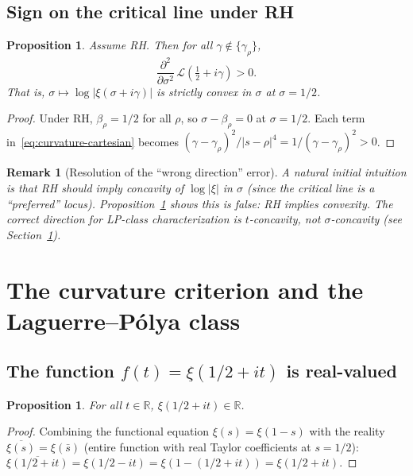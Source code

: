 \documentclass[11pt]{amsart}
\newtheorem{proposition}[theorem]{Proposition}
\newtheorem{remark}[theorem]{Remark}
\begin{document}
\subsection{Sign on the critical line under RH}

\begin{proposition}\label{prop:sigma-convex}
Assume RH. Then for all $\gamma \notin \{\gamma_\rho\}$,
\[
  \frac{\partial^2}{\partial\sigma^2}\,\mathcal{L}\!\left(\tfrac{1}{2}+i\gamma\right) > 0.
\]
That is, $\sigma \mapsto \log|\xi(\sigma+i\gamma)|$ is \emph{strictly convex} in $\sigma$
at $\sigma = 1/2$.
\end{proposition}

\begin{proof}
Under RH, $\beta_\rho = 1/2$ for all $\rho$, so $\sigma - \beta_\rho = 0$
at $\sigma = 1/2$.  Each term in~\eqref{eq:curvature-cartesian} becomes
$(\gamma-\gamma_\rho)^2/|s-\rho|^4 = 1/(\gamma-\gamma_\rho)^2 > 0$.
\end{proof}

\begin{remark}[Resolution of the ``wrong direction'' error]
A natural initial intuition is that RH should imply \emph{concavity} of
$\log|\xi|$ in $\sigma$ (since the critical line is a ``preferred'' locus).
Proposition~\ref{prop:sigma-convex} shows this is \emph{false}: RH implies
\emph{convexity}. The correct direction for LP-class characterization is
$t$-concavity, not $\sigma$-concavity (see Section~\ref{sec:lp}).
\end{remark}

\section{The curvature criterion and the Laguerre--P\'olya class}
\label{sec:lp}

\subsection{The function $f(t) = \xi(1/2+it)$ is real-valued}

\begin{proposition}\label{prop:real}
For all $t \in \mathbb{R}$, $\xi(1/2+it) \in \mathbb{R}$.
\end{proposition}

\begin{proof}
Combining the functional equation $\xi(s) = \xi(1-s)$ with the reality
$\overline{\xi(s)} = \xi(\bar{s})$ (entire function with real Taylor coefficients at
$s = 1/2$):
$\overline{\xi(1/2+it)} = \xi(1/2-it) = \xi(1-(1/2+it)) = \xi(1/2+it)$.
\end{proof}
\end{document}
